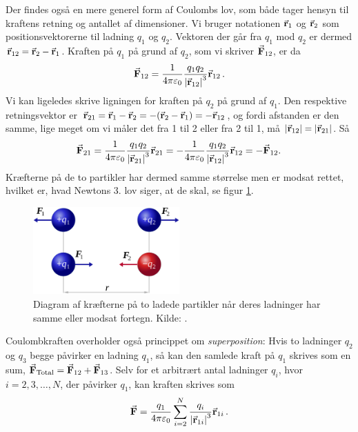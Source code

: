 Der findes også en mere generel form af  Coulombs lov, som både tager hensyn til kraftens retning og antallet af dimensioner. Vi bruger notationen $\va{r}_1$ og $\va{r}_2$ som positionsvektorerne til ladning $q_1$ og $q_2$. Vektoren der går fra $q_1$ mod $q_2$ er dermed $\va{r}_{12}=\va{r}_2-\va{r}_1$. Kraften på $q_1$ på grund af $q_2$, som vi skriver $\va{F}_{12}$, er da
\begin{equation}
    \va{F}_{12}=\frac{1}{4\pi\varepsilon_0}\frac{q_1q_2}{\abs{\va{r}_{12}}^3}\va{r}_{12} \, .
\end{equation}
Vi kan ligeledes skrive ligningen for kraften på $q_2$ på grund af $q_1$. Den respektive retningsvektor er $\va{r}_{21}=\va{r}_1-\va{r}_2=-(\va{r}_2-\va{r}_1)=-\va{r}_{12}$, og fordi afstanden er den samme, lige meget om vi måler det fra 1 til 2 eller fra 2 til 1, må $\abs{\va{r}_{12}}=\abs{\va{r}_{21}}$. Så
\begin{equation}
    \va{F}_{21}=\frac{1}{4\pi\varepsilon_0}\frac{q_1q_2}{\abs{\va{r}_{21}}^3}\va{r}_{21}=-\frac{1}{4\pi\varepsilon_0}\frac{q_1q_2}{\abs{\va{r}_{12}}^3}\va{r}_{12}=-\va{F}_{12}.
\end{equation}
Kræfterne på de to partikler har dermed samme størrelse men er modsat rettet, hvilket er, hvad Newtons 3. lov siger, at de skal, se figur \ref{fig:Coulomb}.
\begin{figure} [h!]
    \centering
    \includegraphics[width=0.5\textwidth]{Elektro/Figurer/Coulomb.eps}
    \caption{Diagram af kræfterne på to ladede partikler når deres ladninger har samme eller modsat fortegn. Kilde: \cite{CoulombLawWikipedia2019}.}
    \label{fig:Coulomb}
\end{figure}

Coulombkraften overholder også princippet om \emph{superposition}: Hvis to ladninger $q_2$ og $q_3$ begge påvirker en ladning $q_1$, så kan den samlede kraft på $q_1$ skrives som en sum, $\va{F}_\text{Total}=\va{F}_{12}+\va{F}_{13}$. Selv for et arbitrært antal ladninger $q_i$, hvor $i=2,3,\dots,N$, der påvirker $q_1$, kan kraften skrives som
\begin{equation} \label{elma:eq:superpos}
    \va{F}=\frac{q_1}{4\pi\varepsilon_0}\sum_{i=2}^{N}\frac{q_i}{\abs{\va{r}_{1i}}^3}\va{r}_{1i} \, .
\end{equation}


